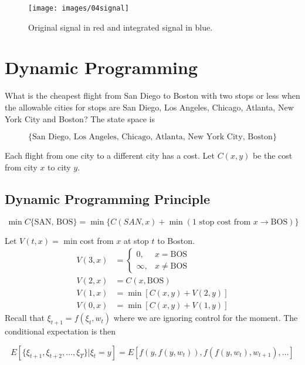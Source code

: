 \begin{figure}[ht!]
\centering
\texttt{[image: images/04signal]}
\caption{Original signal in red and integrated signal in blue.}%
\label{fig:04signal}
\end{figure}

\section{Dynamic Programming}
What is the cheapest flight from San Diego to Boston with two stops or less when the allowable cities for stops are San Diego, Los Angeles, Chicago, Atlanta, New York City and Boston?
The state space is

\begin{equation*}
\{\text{San Diego,~Los~Angeles,~Chicago,~Atlanta,~New~York~City,~Boston}\}
\end{equation*}

Each flight from one city to a different city has a cost.
Let $C(x,y)$ be the cost from city $x$ to city $y$.

\subsection{Dynamic Programming Principle}

\begin{equation*}
\min C\{\text{SAN,~BOS}\} = \min\{C(SAN,x) + \min(\text{1~stop~cost~from }x\to\text{BOS})\}
\end{equation*}

Let $V(t,x) =$ min cost from $x$ at stop $t$ to Boston.
\begin{align*}
V(3,x) &= \begin{cases} 0, & x=\text{BOS} \\ \infty, & x\neq\text{BOS} \end{cases} \\
V(2,x) &= C(x,\text{BOS}) \\
V(1,x) &= \min[C(x,y)+V(2,y)] \\
V(0,x) &= \min[C(x,y)+V(1,y)]
\end{align*}
Recall that $\xi_{t+1}=f(\xi_t,w_t)$ where we are ignoring control for the moment.
The conditional expectation is then

\begin{equation*}
E[\{\xi_{t+1},\xi_{t+2},\ldots,\xi_T\}|\xi_t=y] = E[f(y,f(y,w_t)),f(f(y,w_t),w_{t+1}),\ldots]
\end{equation*}


